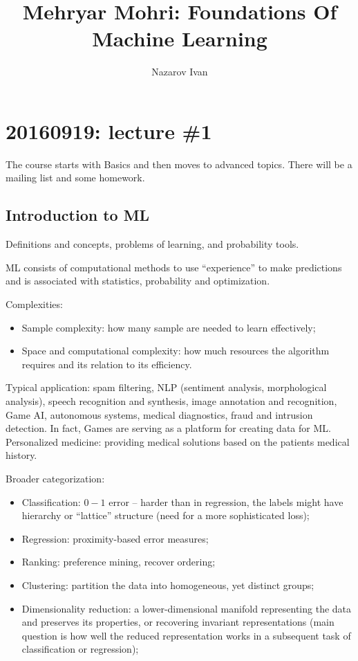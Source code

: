 \documentclass[a4paper]{article}
\title{Mehryar Mohri: Foundations Of Machine Learning}
\author{Nazarov Ivan}
\begin{document}
\section{20160919: lecture \#1} %
\label{sec:20160919_lecture_1}

The course starts with Basics and then moves to advanced topics. There will be
a mailing list and some homework.

\subsection{Introduction to ML} %
\label{sub:introduction_to_ml}
Definitions and concepts, problems of learning, and probability tools.

ML consists of computational methods to use ``experience'' to make predictions and
is associated with statistics, probability and optimization.

Complexities: \begin{itemize}
	\item Sample complexity: how many sample are needed to learn effectively;
	\item Space and computational complexity: how much resources the algorithm
	requires and its relation to its efficiency.
\end{itemize}

Typical application: spam filtering, NLP (sentiment analysis, morphological analysis),
speech recognition and synthesis, image annotation and recognition, Game AI, autonomous
systems, medical diagnostics, fraud and intrusion detection.
\noindent In fact, Games are serving as a platform for creating data for ML.
\noindent Personalized medicine: providing medical solutions based on the patients
medical history.

Broader categorization: \begin{itemize}
	\item Classification: $0-1$ error -- harder than in regression, the labels might
	have hierarchy or ``lattice'' structure (need for a more sophisticated loss);
	\item Regression: proximity-based error measures;
	\item Ranking: preference mining, recover ordering;
	\item Clustering: partition the data into homogeneous, yet distinct groups;
	\item Dimensionality reduction: a lower-dimensional manifold representing the
	data and preserves its properties, or recovering invariant representations (main
	question is how well the reduced representation works in a subsequent task of
	classification or regression);
\end{itemize}
\end{document}
